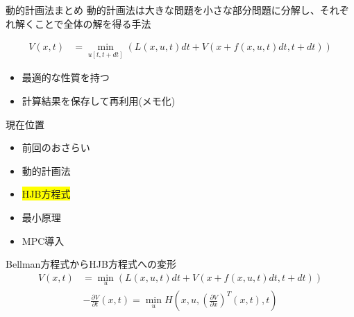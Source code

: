 \documentclass[dvipdfmx,12pt]{beamer}
\begin{document}
    \begin{frame}{動的計画法まとめ}
        動的計画法は大きな問題を小さな部分問題に分解し、それぞれ解くことで全体の解を得る手法

        \begin{tcolorbox}[title=Bellman方程式]
            \begin{align*}
                V(x, t) &= \min_{u[t, t+dt]} \left( L(x, u, t) dt + V \left( x + f(x, u, t) dt, t + dt \right) \right)
            \end{align*}
        \end{tcolorbox}

        \begin{itemize}
            \item 最適的な性質を持つ
            \item 計算結果を保存して再利用(メモ化)
        \end{itemize}
    \end{frame}

    \begin{frame}{現在位置}
        \footnotesize
        \begin{itemize}
            \item 前回のおさらい
            \item 動的計画法
            \item \colorbox{yellow}{HJB方程式}
            \item 最小原理
            \item MPC導入
        \end{itemize}
        \begin{itembox}[l]{Bellman方程式からHJB方程式への変形}
            \begin{align*}
                V(x, t) &= \min_u \left( L(x, u, t) dt + V \left( x + f(x, u, t) dt, t + dt \right) \right)        
            \end{align*}
            \begin{align*}
                -\frac{\partial V}{\partial t}\left(x,t\right) = \min _u H\left(x, u, \left( \frac{\partial V}{\partial x} \right)^T\left(x, t\right), t \right)
            \end{align*}
        \end{itembox}
    \end{frame}
\end{document}
